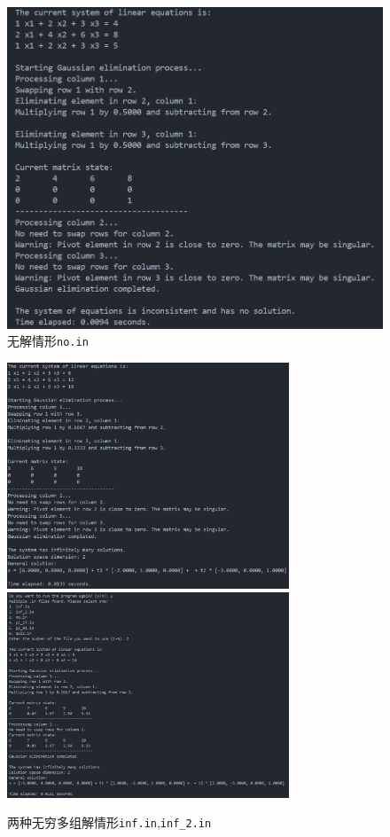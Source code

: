 \begin{figure}[H]
	\centering
	\includegraphics[width=1.0\textwidth]{Problem 2/figs/no.png}
	\caption{无解情形\texttt{no.in}}
\end{figure}

\begin{figure}[H]
	\centering
	\includegraphics[width=0.75\textwidth]{Problem 2/figs/inf.png}
	\includegraphics[width=0.75\textwidth]{Problem 2/figs/inf_2.png}
	\caption{两种无穷多组解情形\texttt{inf.in},\texttt{inf\_2.in}}
\end{figure}

